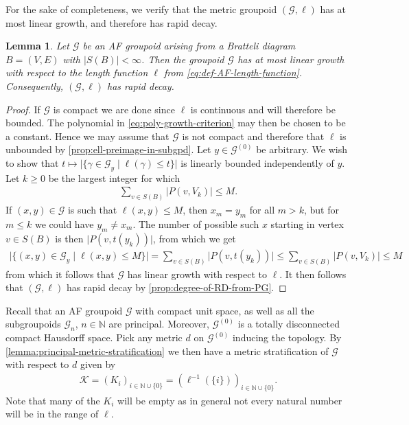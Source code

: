 \documentclass[11pt,a4paper,oneside,final,reqno]{amsart}
\newtheorem{lemma}{Lemma}[section]
\theoremstyle{definition}
\newcommand{\G}{\mathcal{G}}
\newcommand{\Go}{\mathcal{G}^{(0)}}
\newcommand{\cK}{\mathcal{K}}
\newcommand{\N}{\mathbb{N}}
\numberwithin{equation}{section}
\begin{document}
	For the sake of completeness, we verify that the metric groupoid $(\G, \ell)$ has at most linear growth, and therefore has rapid decay. 

	\begin{lemma}\label{lemma:ellB-gives-linear-growth}
		Let $\G$ be an AF groupoid  arising from a Bratteli diagram $B = (V,E)$ with $\vert S(B)\vert < \infty$.
		Then the groupoid $\G$ has at most linear growth with respect to the length function $\ell$ from \eqref{eq:def-AF-length-function}. Consequently, $(\G, \ell)$ has rapid decay.  
	\end{lemma}
	
	\begin{proof}
		If $\G$ is compact we are done since $\ell$ is continuous and will therefore  
		be bounded. The polynomial in \eqref{eq:poly-growth-criterion} may then be chosen to be a constant.  
		Hence we may assume that $\G$ is not compact and therefore that $\ell$ 
		is unbounded by \cref{prop:ell-preimage-in-subgpd}.
		Let $y \in \G^{(0)}$ be arbitrary. We wish to show that $ t\mapsto \vert \{ \gamma \in \G_y \mid \ell(\gamma)\leq t    \} \vert $ is linearly bounded independently of $y$. Let $k \geq 0$ be the largest integer for which 
		\begin{align*}
			\sum_{v \in S(B)} \vert P(v, V_k) \vert \leq M.
		\end{align*}
		If $(x,y) \in \G$ is such that $\ell(x,y) \leq M$, then $x_m = y_m$ for all $m > k$, but for $m\leq k$ we could have $y_m \neq x_m$. The number of possible such $x$ starting in vertex $v \in S(B)$ is then $\vert P(v, t(y_k))\vert$, from which we get
		\begin{align*}
			\vert \{ (x,y) \in \G_y \mid \ell(x,y)\leq M    \} \vert = \sum_{v \in S(B)} \vert P(v , t(y_k)) \vert \leq \sum_{v \in S(B)} \vert P(v , V_k) \vert \leq M
		\end{align*}
		from which it follows that $\G$ has linear growth with respect to $\ell$. It then follows that $(\G, \ell)$ has rapid decay by \cref{prop:degree-of-RD-from-PG}. 
	\end{proof}
	
	Recall that an AF groupoid $\G$ with compact unit space, as well as all the subgroupoids $\G_n$, $n \in \N$ are principal. Moreover, $\Go$ is a 
	totally disconnected compact Hausdorff space. 
	Pick any metric $d$ on $\Go$ inducing the topology. 
	By \cref{lemma:principal-metric-stratification} we then have a metric stratification of $\G$ with respect to $d$ given by
	\begin{align}\label{eq:metric-stratification-AF}
		\cK = (K_i)_{i \in \N \cup \{0\}} = (\ell^{-1}(\{i\}))_{i\in \N \cup \{0\}}.
	\end{align}
	Note that many of the $K_i$ will be empty as in general not every natural number will be in the range of $\ell$. 
	
\end{document}
